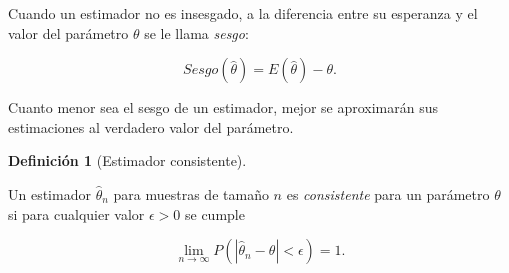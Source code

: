 \documentclass[
  a4paper,
]{scrreport}
\theoremstyle{definition}
\newtheorem{definition}{Definición}[chapter]
\theoremstyle{definition}
\theoremstyle{plain}
\theoremstyle{remark}
\begin{document}
Cuando un estimador no es insesgado, a la diferencia entre su esperanza
y el valor del parámetro \(\theta\) se le llama \emph{sesgo}:

\[
Sesgo(\hat \theta) = E(\hat \theta)-\theta.
\]

Cuanto menor sea el sesgo de un estimador, mejor se aproximarán sus
estimaciones al verdadero valor del parámetro.

\begin{definition}[Estimador
consistente]\protect\hypertarget{def-estimador-consistente}{}\label{def-estimador-consistente}

Un estimador \(\hat \theta_n\) para muestras de tamaño \(n\) es
\emph{consistente} para un parámetro \(\theta\) si para cualquier valor
\(\epsilon>0\) se cumple

\[
\lim_{n\rightarrow \infty} P(|\hat \theta_n-\theta|<\epsilon)=1.
\]

\end{definition}
\end{document}
